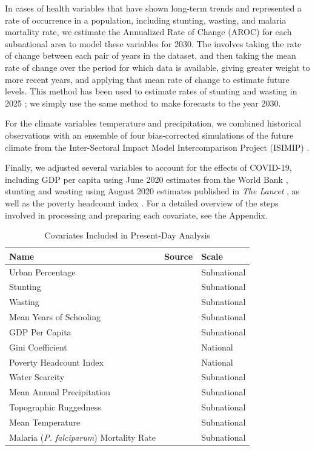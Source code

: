 \documentclass{article}
\begin{document}
In cases of health variables that have shown long-term trends and represented a rate of occurrence in a population, including stunting, wasting, and malaria mortality rate, we estimate the Annualized Rate of Change (AROC) for each subnational area to model these variables for 2030. The involves taking the rate of change between each pair of years in the dataset, and then taking the mean rate of change over the period for which data is available, giving greater weight to more recent years, and applying that mean rate of change to estimate future levels.  This method has been used to estimate rates of stunting and wasting in 2025 \citep{Local2020}; we simply use the same method to make forecasts to the year 2030.

For the climate variables temperature and precipitation, we combined historical observations with an ensemble of four bias-corrected simulations of the future climate from the Inter-Sectoral Impact Model Intercomparison Project (ISIMIP) \citep{warszawski2014inter}.

Finally, we adjusted several variables to account for the effects of COVID-19, including GDP per capita using June 2020 estimates from the World Bank \citep{prospects2020}, stunting and wasting using August 2020 estimates published in \textit{The Lancet} \citep{headey2020impacts}, as well as the poverty headcount index \cite{Cuaresma2018}.  For a detailed overview of the steps involved in processing and preparing each covariate, see the Appendix.

\begin{table}[H]
  \centering
	\begin{tabular}{lll}
		\toprule
    Name & Source & Scale \\
		\midrule
    Urban Percentage & \citep{Jones2016} & Subnational \\
    Stunting & \citep{Local2020} & Subnational \\
    Wasting & \citep{Local2020} & Subnational \\
    Mean Years of Schooling & \citep{Smits2019, KC2017} & Subnational\\
    GDP Per Capita & \citep{Smits2019, Dellink2017} & Subnational \\
    Gini Coefficient & \citep{Rao2019a} & National\\
    Poverty Headcount Index & \citep{Cuaresma2018} & National \\
    Water Scarcity & \citep{greve2018global} & Subnational \\
    Mean Annual Precipitation &  \cite{abatzoglou2018terraclimate, warszawski2014inter} & Subnational \\
    Topographic Ruggedness &  \cite{USGS1996, Riley1999} & Subnational \\
    Mean Temperature &  \cite{abatzoglou2018terraclimate, warszawski2014inter} & Subnational \\
    Malaria (\textit{P. falciparum}) Mortality Rate &  \cite{Weiss2019} & Subnational \\
		\bottomrule
	\end{tabular}
	\caption{Covariates Included in Present-Day Analysis}
	\label{tab:covars}
\end{table}
\end{document}
